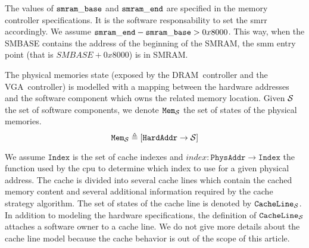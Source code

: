 The values of $\mathtt{smram\_base}$ and $\mathtt{smram\_end}$ are specified in the
memory controller specifications.
%
It is the software responsability to set the \ac{smrr} accordingly.
%
We assume $\mathtt{smram\_end} - \mathtt{smram\_base} > 0x8000$.  This way, when the
SMBASE contains the address of the beginning of the SMRAM, the \ac{smm} entry
point (that is $SMBASE + 0x8000$) is in SMRAM.

The physical memories state (exposed by the DRAM controller and the
VGA controller) is modelled with a mapping between the hardware addresses and
the software component which owns the related memory location.
%
Given $\mathcal{S}$ the set of software components, we denote
$\texttt{Mem}_{\mathcal{S}}$ the set of states of the physical memories.
\[
  \texttt{Mem}_{\mathcal{S}} \triangleq [ \texttt{HardAddr} \rightarrow \mathcal{S} ]
\]

We assume $\texttt{Index}$ is the set of cache indexes and
$index : \texttt{PhysAddr} \rightarrow \texttt{Index}$ the function used by the
\ac{cpu} to determine which index to use for a given physical address.
%
The cache is divided into several cache lines which contain the cached memory
content and several additional information required by the cache strategy
algorithm.
%
The set of states of the cache line is denoted by
$\texttt{CacheLine}_{\mathcal{S}}$.
%
In addition to modeling the hardware specifications, the definition of
$\texttt{CacheLine}_{\mathcal{S}}$ attaches a software owner to a cache line.
%
We do not give more details about the cache line model because the cache
behavior is out of the scope of this article.


